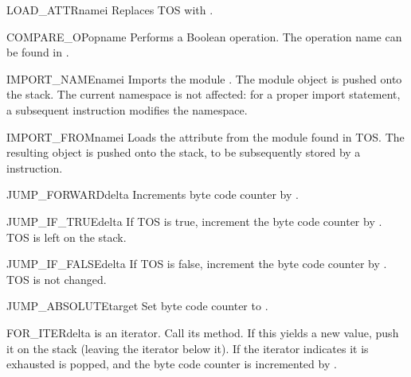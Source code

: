 \begin{opcodedesc}{LOAD_ATTR}{namei}
Replaces TOS with .
\end{opcodedesc}

\begin{opcodedesc}{COMPARE_OP}{opname}
Performs a Boolean operation.  The operation name can be found
in .
\end{opcodedesc}

\begin{opcodedesc}{IMPORT_NAME}{namei}
Imports the module .  The module object is
pushed onto the stack.  The current namespace is not affected: for a
proper import statement, a subsequent  instruction
modifies the namespace.
\end{opcodedesc}

\begin{opcodedesc}{IMPORT_FROM}{namei}
Loads the attribute  from the module found in
TOS. The resulting object is pushed onto the stack, to be subsequently
stored by a  instruction.
\end{opcodedesc}

\begin{opcodedesc}{JUMP_FORWARD}{delta}
Increments byte code counter by .
\end{opcodedesc}

\begin{opcodedesc}{JUMP_IF_TRUE}{delta}
If TOS is true, increment the byte code counter by .  TOS is
left on the stack.
\end{opcodedesc}

\begin{opcodedesc}{JUMP_IF_FALSE}{delta}
If TOS is false, increment the byte code counter by .  TOS
is not changed. 
\end{opcodedesc}

\begin{opcodedesc}{JUMP_ABSOLUTE}{target}
Set byte code counter to .
\end{opcodedesc}

\begin{opcodedesc}{FOR_ITER}{delta}
 is an iterator.  Call its  method.  If this
yields a new value, push it on the stack (leaving the iterator below
it).  If the iterator indicates it is exhausted   is
popped, and the byte code counter is incremented by .
\end{opcodedesc}

